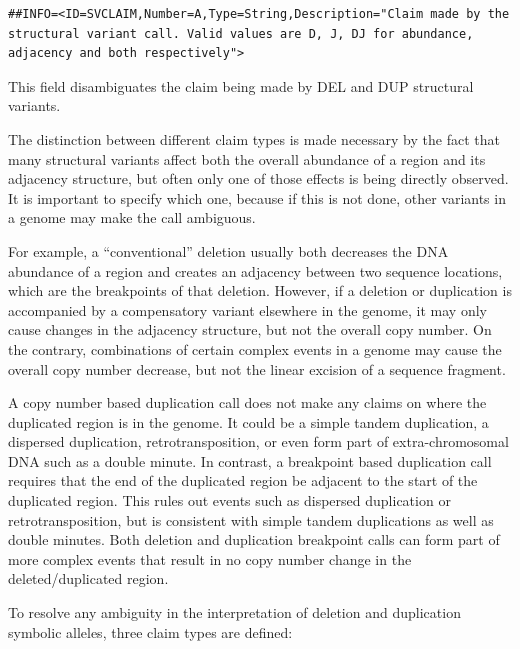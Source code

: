 \documentclass[8pt]{article}
\begin{document}
\footnotesize
\begin{verbatim}
##INFO=<ID=SVCLAIM,Number=A,Type=String,Description="Claim made by the structural variant call. Valid values are D, J, DJ for abundance, adjacency and both respectively">
\end{verbatim}
\normalsize

This field disambiguates the claim being made by DEL and DUP structural variants.

The distinction between different claim types is made necessary by the fact that many structural variants affect both the overall abundance of a region and its adjacency structure, but often only one of those effects is being directly observed.
It is important to specify which one, because if this is not done, other variants in a genome may make the call ambiguous.

For example, a ``conventional'' deletion usually both decreases the DNA abundance of a region and creates an adjacency between two sequence locations, which are the breakpoints of that deletion.
However, if a deletion or duplication is accompanied by a compensatory variant elsewhere in the genome, it may only cause changes in the adjacency structure, but not the overall copy number.
On the contrary, combinations of certain complex events in a genome may cause the overall copy number decrease, but not the linear excision of a sequence fragment.

A copy number based duplication call does not make any claims on where the duplicated region is in the genome.
It could be a simple tandem duplication, a dispersed duplication, retrotransposition, or even form part of extra-chromosomal DNA such as a double minute.
In contrast, a breakpoint based duplication call requires that the end of the duplicated region be adjacent to the start of the duplicated region.
This rules out events such as dispersed duplication or retrotransposition, but is consistent with simple tandem duplications as well as double minutes.
Both deletion and duplication breakpoint calls can form part of more complex events that result in no copy number change in the deleted/duplicated region.

To resolve any ambiguity in the interpretation of deletion and duplication symbolic alleles, three claim types are defined:
\end{document}

